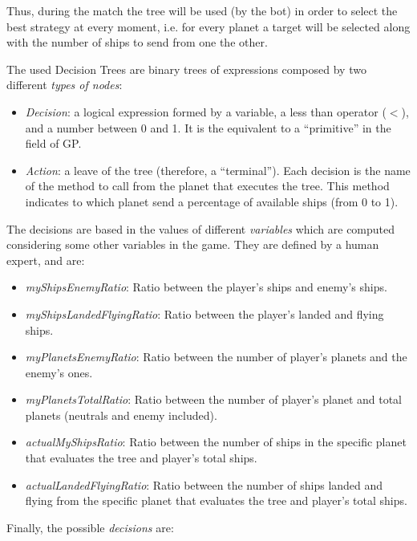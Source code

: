 \documentclass[preprint]{elsarticle}
\begin{document}
Thus, during the match the tree will be used (by the bot) in order to select the best strategy at every moment, i.e. for every planet a target will be selected along with the number of ships to send from one the other.

\noindent The used Decision Trees are binary trees of expressions composed by two different \textit{types of nodes}:

\begin{itemize}
\item {\em Decision}: a logical expression formed by a variable, a less than operator ($<$), and a number between 0 and 1. It is the equivalent to a ``primitive'' in the field of GP.
\item {\em Action}: a leave of the tree (therefore, a ``terminal''). Each decision is the name of the method to call from the planet that executes the tree. This method indicates to which planet send a percentage of available ships (from 0 to 1). 
\end{itemize}

\noindent The decisions are based in the values of different \textit{variables} which are computed considering some other variables in the game. They are defined by a human expert, and are:

\begin{itemize}
\item {\em myShipsEnemyRatio}: Ratio between the player's ships and enemy's ships.
\item {\em myShipsLandedFlyingRatio}: Ratio between the player's landed and flying ships.
\item {\em myPlanetsEnemyRatio}: Ratio between the number of player's planets and the enemy's ones.
\item {\em myPlanetsTotalRatio}: Ratio between the number of player's planet and total planets (neutrals and enemy included).
\item {\em actualMyShipsRatio}: Ratio between the number of ships in the specific planet that evaluates the tree and player's total ships.
\item {\em actualLandedFlyingRatio}: Ratio between the number of ships landed and flying from the specific planet that evaluates the tree and player's total ships.
\end{itemize}

\noindent Finally, the possible \textit{decisions} are:
\end{document}
